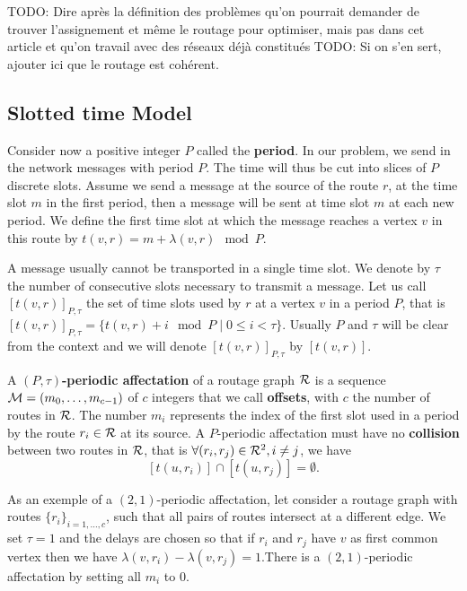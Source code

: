 \documentclass[a4paper,10pt]{article}
\newcommand{\todo}[1]{{\color{red} TODO: {#1}}}
\begin{document}
     \todo{Dire après  la définition des problèmes qu'on pourrait demander de trouver l'assignement et même le routage pour optimiser, mais pas dans cet article
     et qu'on travail avec des réseaux déjà constitués}
      \todo{Si on s'en sert, ajouter ici que le routage est cohérent.}

   \subsection{Slotted time Model}
      Consider now a positive integer $P$ called the {\bf period}. In our problem, we send in the network
      messages with period $P$. The time will thus be cut into slices of $P$ discrete slots. Assume we send a message at the source of the route $r$, at the time slot $m$ in the first period, then a message will be sent at time slot $m$ at each new period. We define the first time slot at which the message reaches a vertex $v$ in this route by $t(v,r) = m + \lambda(v,r) \mod P$. 

      A message usually cannot be transported in a single time slot. We denote by $\tau$ the number 
      of consecutive slots necessary to transmit a message. Let us call $[t(v,r)]_{P,\tau}$ the set of time slots used by $r$ at a vertex $v$ in a period $P$, that is $[t(v,r)]_{P,\tau} = \{t(v,r) + i \mod P \mid 0 \leq i < \tau \}$. Usually $P$ and $\tau$ will be clear from the context and we will denote $[t(v,r)]_{P,\tau}$ by $[t(v,r)]$.
      
      
      A {\bf $(P,\tau)$-periodic affectation} of a routage graph $\cal R$ is a sequence  ${\cal M}=(m_0, \ldots ,m_{c-1})$ of $c$ integers that we call {\bf offsets}, with $c$ the number of routes in $\cal R$. The number $m_i$ represents the index of the first slot used in a period  by the route $r_i \in {\cal R}$ at its source.
      A $P$-periodic affectation must have no {\bf collision} between two routes in ${\cal R}$, that is $\forall (r_i, r_j) \in {\cal R}^2, i \neq j$, %
      we have $$[t(u,r_i)] \cap [t(u,r_j)] = \emptyset .$$
      

      As an exemple of a $(2,1)$-periodic affectation, let consider a routage graph with routes $\{r_i\}_{i=1,\dots,c}$, such that all pairs of routes intersect at a different edge.
      We set $\tau = 1$ and the delays are chosen so that if $r_i$ and $r_j$ have $v$ as first common vertex then we have $\lambda(v,r_i) - \lambda(v,r_j)=1$.There is a $(2,1)$-periodic affectation by setting all $m_i$ to $0$.
\end{document}
